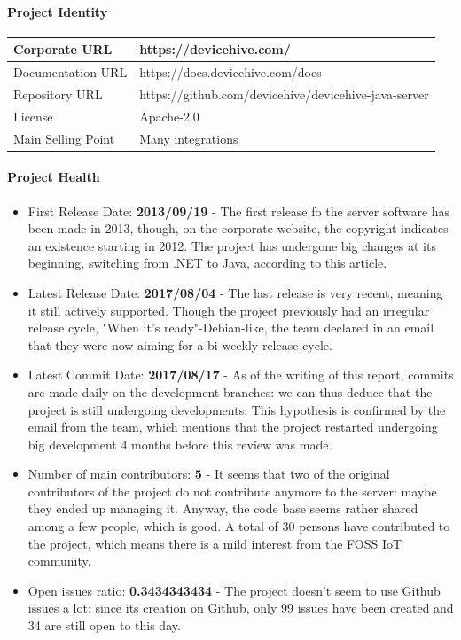 \documentclass{article}
\begin{document}
\paragraph{Project Identity}

\begin{center}
\begin{tabular}{|l|l|}
\hline
Corporate URL & https://devicehive.com/ \\ \hline
Documentation URL & https://docs.devicehive.com/docs \\ \hline
Repository URL & https://github.com/devicehive/devicehive-java-server \\ \hline
License & Apache-2.0 \\ \hline
Main Selling Point & Many integrations \\ \hline
\end{tabular}
\end{center}

\paragraph{Project Health}

\begin{itemize}
\item First Release Date: \textbf{2013/09/19} - The first release fo the server software has been made in 2013, though, on the corporate website, the copyright indicates an existence starting in 2012. The project has undergone big changes at its beginning, switching from .NET to Java, according to \href{http://www.techrepublic.com/blog/tablets-in-the-enterprise/devicehive-an-open-source-m2m-development-platform/}{this article}.
\item Latest Release Date: \textbf{2017/08/04} - The last release is very recent, meaning it still actively supported. Though the project previously had an irregular release cycle, "When it's ready"-Debian-like, the team declared in an email that they were now aiming for a bi-weekly release cycle.
\item Latest Commit Date: \textbf{2017/08/17} - As of the writing of this report, commits are made daily on the development branches: we can thus deduce that the project is still undergoing developments. This hypothesis is confirmed by the email from the team, which mentions that the project restarted undergoing big development 4 months before this review was made.
\item Number of main contributors: \textbf{5} - It seems that two of the original contributors of the project do not contribute anymore to the server: maybe they ended up managing it. Anyway, the code base seems rather shared among a few people, which is good. A total of 30 persons have contributed to the project, which means there is a mild interest from the FOSS IoT community.
\item Open issues ratio: \textbf{0.3434343434} - The project doesn't seem to use Github issues a lot: since its creation on Github, only 99 issues have been created and 34 are still open to this day.
\end{itemize}
\end{document}
